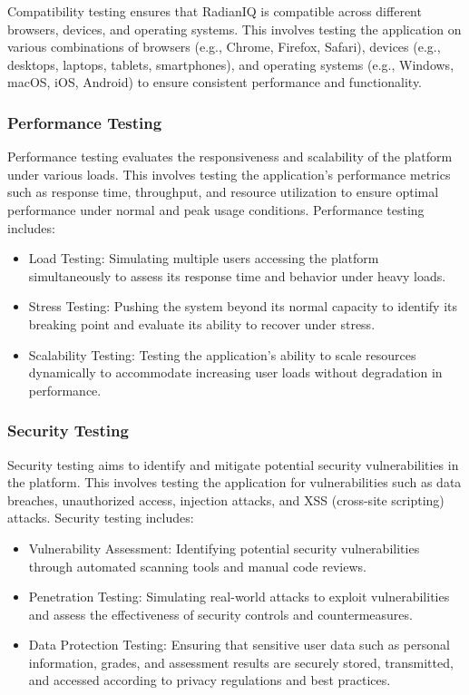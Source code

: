		Compatibility testing ensures that RadianIQ is compatible across different browsers, devices, and operating systems. This involves testing the application on various combinations of browsers (e.g., Chrome, Firefox, Safari), devices (e.g., desktops, laptops, tablets, smartphones), and operating systems (e.g., Windows, macOS, iOS, Android) to ensure consistent performance and functionality.
		
		\subsubsection{Performance Testing}
		
		Performance testing evaluates the responsiveness and scalability of the platform under various loads. This involves testing the application's performance metrics such as response time, throughput, and resource utilization to ensure optimal performance under normal and peak usage conditions. Performance testing includes:
		
		\begin{itemize}
			\item Load Testing: Simulating multiple users accessing the platform simultaneously to assess its response time and behavior under heavy loads.
			\item Stress Testing: Pushing the system beyond its normal capacity to identify its breaking point and evaluate its ability to recover under stress.
			\item Scalability Testing: Testing the application's ability to scale resources dynamically to accommodate increasing user loads without degradation in performance.
		\end{itemize}
		
		\subsubsection{Security Testing}
		
		Security testing aims to identify and mitigate potential security vulnerabilities in the platform. This involves testing the application for vulnerabilities such as data breaches, unauthorized access, injection attacks, and XSS (cross-site scripting) attacks. Security testing includes:
		
		\begin{itemize}
			\item Vulnerability Assessment: Identifying potential security vulnerabilities through automated scanning tools and manual code reviews.
			\item Penetration Testing: Simulating real-world attacks to exploit vulnerabilities and assess the effectiveness of security controls and countermeasures.
			\item Data Protection Testing: Ensuring that sensitive user data such as personal information, grades, and assessment results are securely stored, transmitted, and accessed according to privacy regulations and best practices.
		\end{itemize}

